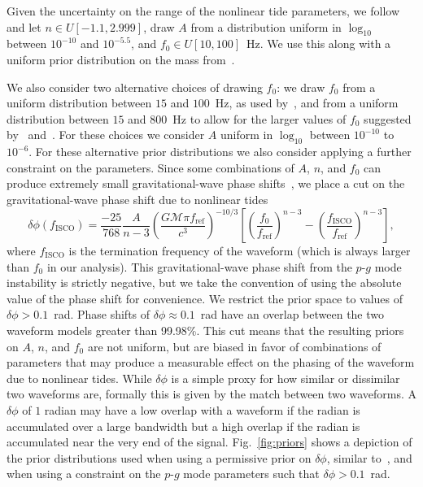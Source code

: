 Given the uncertainty on the range of the nonlinear tide parameters, we follow~\cite{abbott2019constraining} and let $n \in U[-1.1, 2.999]$, draw $A$ from a distribution uniform in $\log_{10}$ between $10^{-10}$ and $10^{-5.5}$, and $f_0 \in U[10, 100]$~Hz. We use this along with a uniform prior distribution on the mass from~\cite{de2018tidal}.

We also consider two alternative choices of drawing $f_0$: we draw $f_0$ from a uniform distribution between $15$ and $100$~Hz, as used by~\cite{Essick:2016tkn}, and from a uniform distribution between $15$ and $800$~Hz to allow for the larger values of $f_0$ suggested by~\cite{Zhou:2018tvc} and~\cite{Andersson:2017iav}. For these choices we consider $A$ uniform in $\log_{10}$ between $10^{-10}$ to $10^{-6}$. For these alternative prior distributions we also consider applying a further constraint on the parameters. Since some combinations of $A$, $n$, and $f_0$ can produce extremely small gravitational-wave phase shifts~\citep{Essick:2016tkn}, we place a cut on the gravitational-wave phase shift due to nonlinear tides
\begin{equation}
\delta \phi(f_\mathrm{ISCO}) =
                      \frac{-25}{768}  \frac{A}{n-3} \left( \frac{G \mathcal{M} \pi f_{\mathrm{ref}}}{c^3} \right)^{-10/3} \left[ \left( \frac{f_0}{f_{\mathrm{ref}}} \right)^{n-3} - \left(\frac{f_\mathrm{ISCO}}{f_{\mathrm{ref}}} \right)^{n-3} \right],
\end{equation}
where $f_\mathrm{ISCO}$ is the termination frequency of the waveform (which is always larger than $f_0$ in our analysis). This gravitational-wave phase shift from the $p$-$g$ mode instability is strictly negative, but we take the convention of using the absolute value of the phase shift for convenience. We restrict the prior space to values of $\delta \phi > 0.1$~rad. Phase shifts of $\delta \phi \approx 0.1$~rad have an overlap between the two waveform models greater than 99.98\%. This cut means that the resulting priors on $A$, $n$, and $f_0$ are not uniform, but are biased in favor of combinations of parameters that may produce a measurable effect on the phasing of the waveform due to nonlinear tides. While $\delta \phi$ is a simple proxy for how similar or dissimilar two waveforms are, formally this is given by the match between two waveforms. A $\delta \phi$ of $1$ radian may have a low overlap with a waveform if the radian is accumulated over a large bandwidth but a high overlap if the radian is accumulated near the very end of the signal. Fig.~\ref{fig:priors} shows a depiction of the prior distributions used when using a permissive prior on $\delta \phi$, similar to~\cite{abbott2019constraining}, and when using a constraint on the $p$-$g$ mode parameters such that $\delta \phi > 0.1$~rad.

